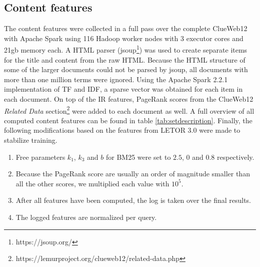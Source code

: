 \subsection{Content features} \label{sec:contentfeature}
The content features were collected in a full pass over the complete ClueWeb12 with Apache Spark using 116 Hadoop worker nodes with 3 executor cores and 21gb memory each. A HTML parser (jsoup\footnote{https://jsoup.org/}) was used to create separate items for the title and content from the raw HTML. Because the HTML structure of some of the larger documents could not be parsed by jsoup, all documents with more than one million terms were ignored. Using the Apache Spark 2.2.1 implementation of TF and IDF, a sparse vector was obtained for each item in each document.  On top of the IR features, PageRank scores from the ClueWeb12 \textit{Related Data} section\footnote{https://lemurproject.org/clueweb12/related-data.php} were added to each document as well. A full overview of all computed content features can be found in table \ref{tab:setdescription}. Finally, the following modifications based on the features from LETOR 3.0 \cite{qin2010letor} were made to stabilize training.
\begin{enumerate}  
\item Free parameters $k_1$, $k_3$ and $b$ for BM25 were set to $2.5$, $0$ and $0.8$ respectively. 
\item Because the PageRank score are usually an order of magnitude smaller than all the other scores, we multiplied each value with $10^5$.
\item After all features have been computed, the log is taken over the final results.
\item The logged features are normalized per query.  
\end{enumerate}


